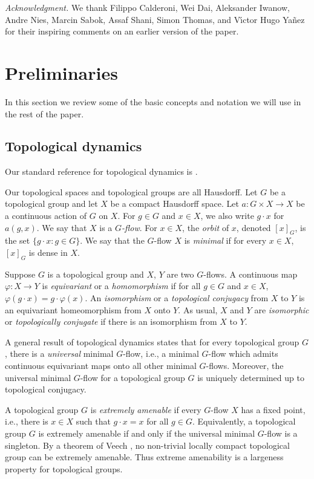 \documentclass{amsart}
\theoremstyle{definition}
\theoremstyle{remark}
\begin{document}
{\it Acknowledgment.} We thank Filippo Calderoni, Wei Dai, Aleksander Iwanow, Andre Nies, Marcin Sabok, Assaf Shani, Simon Thomas, and V\'{\i}ctor Hugo Ya\~{n}ez for their inspiring comments on an earlier version of the paper. 






\section{Preliminaries\label{sec:2}}
In this section we review some of the basic concepts and notation we will use in the rest of the paper.

\subsection{Topological dynamics} Our standard reference for topological dynamics is \cite{AusBook}.

Our topological spaces and topological groups are all Hausdorff. 
Let $G$ be a topological group and let $X$ be a compact Hausdorff space. Let $a\colon G\times X\to X$ be a continuous action of $G$ on $X$. For $g\in G$ and $x\in X$, we also write $g\cdot x$ for $a(g,x)$. We say that $X$ is a {\em $G$-flow}. For $x\in X$, the {\em orbit} of $x$, denoted $[x]_G$, is the set $\{g\cdot x\colon g\in G\}$. We say that the $G$-flow $X$ is {\em minimal} if for every $x\in X$, $[x]_G$ is dense in $X$. 

Suppose $G$ is a topological group and $X$, $Y$ are two $G$-flows. A continuous map $\varphi\colon X\to Y$ is {\em equivariant} or a {\em homomorphism} if for all $g\in G$ and $x\in X$, $\varphi(g\cdot x)=g\cdot \varphi(x)$.  An {\em isomorphism} or a {\em topological conjugacy} from $X$ to $Y$ is an equivariant homeomorphism from $X$ onto $Y$. As usual, $X$ and $Y$ are {\em isomorphic} or {\em topologically conjugate} if there is an isomorphism from $X$ to $Y$.

A general result of topological dynamics states that for every topological group $G$, there is a {\em universal} minimal $G$-flow, i.e., a minimal $G$-flow which admits continuous equivariant maps onto all other minimal $G$-flows. Moreover, the universal minimal $G$-flow for a topological group $G$ is uniquely determined up to topological conjugacy. 

A topological group $G$ is {\em extremely amenable} if every $G$-flow $X$ has a fixed point, i.e., there is $x\in X$ such that $g\cdot x=x$ for all $g\in G$. Equivalently, a topological group $G$ is extremely amenable if and only if the universal minimal $G$-flow is a singleton. By a theorem of Veech \cite{Veech}, no non-trivial locally compact topological group can be extremely amenable. Thus extreme amenability is a largeness property for topological groups.
\end{document}
